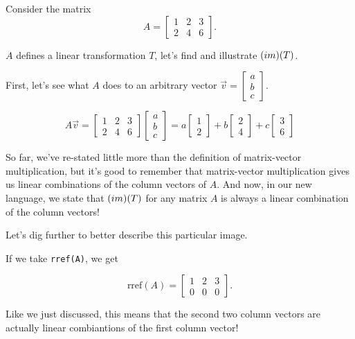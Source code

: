 \documentclass{ximera}
\begin{document}
\begin{example}\label{ex:image1}
Consider the matrix
$$A=\begin{bmatrix}1&2&3\\2&4&6\end{bmatrix}.$$

$A$ defines a linear transformation $T$, let's find and illustrate $\mbox(im)(T)$.
 

First, let's see what $A$ does to an arbitrary vector $\vec{v}=\begin{bmatrix}a\\b\\c\end{bmatrix}$.
 
$$A\vec{v}=\begin{bmatrix}1&2&3\\2&4&6\end{bmatrix}\begin{bmatrix}a\\b\\c\end{bmatrix}=a\begin{bmatrix}1\\2\end{bmatrix}+b\begin{bmatrix}2\\4\end{bmatrix}+c\begin{bmatrix}3\\6\end{bmatrix}$$
 
So far, we've re-stated little more than the definition of matrix-vector multiplication, but it's good to remember that matrix-vector multiplication gives us linear combinations of the column vectors of $A$. And now, in our new language, we state that $\mbox(im)(T)$ for any matrix $A$ is always a linear combination of the column vectors!

Let's dig further to better describe this particular image. 



If we take \texttt{rref(A)}, we get

$$\text{rref}(A)=\begin{bmatrix}1&2&3\\0&0&0\end{bmatrix}.$$

Like we just discussed, this means that the second two column vectors are actually linear combiantions of the first column vector!


\end{example}
\end{document}
